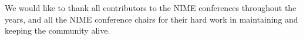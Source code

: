 %
%



We would like to thank all contributors to the NIME conferences throughout the years, and all the NIME conference chairs for their hard work in maintaining and keeping the community alive.

